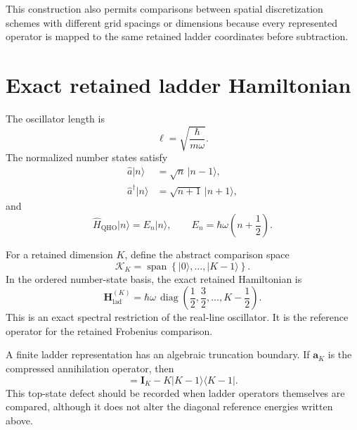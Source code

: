 This construction also permits comparisons between spatial discretization
schemes with different grid spacings or dimensions because every represented
operator is mapped to the same retained ladder coordinates before subtraction.

\section{Exact retained ladder Hamiltonian}


The oscillator length is
\begin{equation}
    \ell
    =
    \sqrt{\frac{\hbar}{m\omega}}.
\end{equation}
The normalized number states satisfy
\begin{align}
    \hat a\lvert n\rangle
    &=
    \sqrt{n}\,\lvert n-1\rangle,
    \\
    \hat a^\dagger\lvert n\rangle
    &=
    \sqrt{n+1}\,\lvert n+1\rangle,
\end{align}
and
\begin{equation}
    \hat H_{\mathrm{QHO}}\lvert n\rangle
    =
    E_n\lvert n\rangle,
    \qquad
    E_n
    =
    \hbar\omega
    \left(n+\frac{1}{2}\right).
\end{equation}

For a retained dimension $K$, define the abstract comparison space
\begin{equation}
    \mathcal K_K
    =
    \operatorname{span}
    \left\{
        \lvert 0\rangle,\ldots,\lvert K-1\rangle
    \right\}.
\end{equation}
In the ordered number-state basis, the exact retained Hamiltonian is
\begin{equation}
    \mathbf H_{\mathrm{lad}}^{(K)}
    =
    \hbar\omega\,
    \operatorname{diag}
    \left(
        \frac{1}{2},
        \frac{3}{2},
        \ldots,
        K-\frac{1}{2}
    \right).
\end{equation}
This is an exact spectral restriction of the real-line oscillator. It is the
reference operator for the retained Frobenius comparison.

A finite ladder representation has an algebraic truncation boundary. If
$\mathbf a_K$ is the compressed annihilation operator, then
\begin{equation}
    [\mathbf a_K,\mathbf a_K^\dagger]
    =
    \mathbf I_K
    -
    K\lvert K-1\rangle\langle K-1\rvert.
\end{equation}
This top-state defect should be recorded when ladder operators themselves are
compared, although it does not alter the diagonal reference energies written
above.

